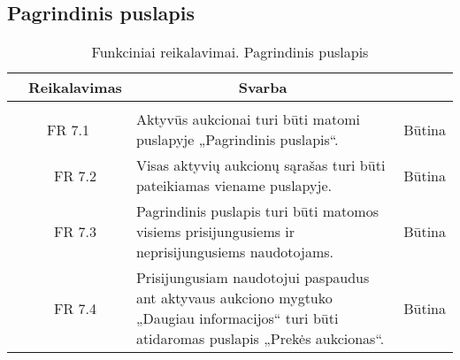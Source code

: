 \documentclass{VUMIFPSkursinis}
\begin{document}
\subsection{Pagrindinis puslapis}
\begin{table}[H]
	\caption{Funkciniai reikalavimai. Pagrindinis puslapis}
	\begin{tabular}{|p{1cm}|p{1cm}|p{}|p{}|}
		\hline 
		\rowcolor{gray!50}
		\multicolumn{2}{|c|}{{\bfseries Kodas}}&
		\multicolumn{1}{c|}{{\bfseries Reikalavimas}}&
		\multicolumn{1}{c|}{{\bfseries Svarba}}\\
		\hline
		\rowcolor{lightgray}
		\multicolumn{4}{|c|}{Pagrindinis puslapis}\\		
		
		\hline
		\multicolumn{2}{|c|}{FR 7.1}&
		{Aktyvūs aukcionai turi būti matomi puslapyje „Pagrindinis puslapis“.
		}&		
		\multicolumn{1}{c|}{Būtina}\\
		\hline
		\multicolumn{1}{|c}{}&
		\multicolumn{1}{c|}{FR 7.2}&
		{Visas aktyvių aukcionų sąrašas turi būti pateikiamas viename puslapyje.
		}&		
		\multicolumn{1}{c|}{Būtina}\\
		\hline	
		\multicolumn{1}{|c}{}&
		\multicolumn{1}{c|}{FR 7.3}&
		{Pagrindinis puslapis turi būti matomos visiems prisijungusiems ir neprisijungusiems naudotojams.
		}&
		\multicolumn{1}{c|}{Būtina}\\									
		\hline
		\multicolumn{1}{|c}{}&
		\multicolumn{1}{c|}{FR 7.4}&
		{Prisijungusiam naudotojui paspaudus ant aktyvaus aukciono mygtuko „Daugiau informacijos“ turi būti atidaromas puslapis „Prekės aukcionas“.
		}&
		\multicolumn{1}{c|}{Būtina}\\									
		\hline
	\end{tabular}		
\end{table}
\end{document}
